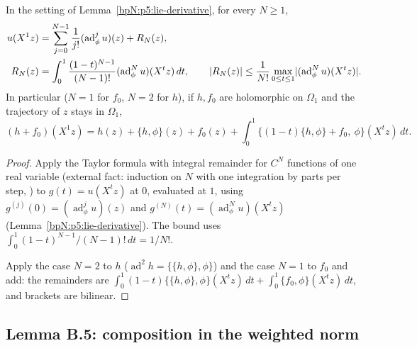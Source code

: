 \begin{lemma}\label{bpN:p5:taylor}
In the setting of Lemma~\ref{bpN:p5:lie-derivative}, for every $N\ge1$,
\begin{align*}
u(X^1z)&=\sum_{j=0}^{N-1}\frac1{j!}(\operatorname{ad}^j_\phi u)(z)+R_N(z),\\
R_N(z)&=\int_0^1\frac{(1-t)^{N-1}}{(N-1)!}(\operatorname{ad}^N_\phi u)(X^tz)\,dt,\qquad\lvert R_N(z)\rvert\le\frac1{N!}\max_{0\le t\le1}\lvert (\operatorname{ad}^N_\phi u)(X^tz)\rvert.
\end{align*}
In particular ($N=1$ for $f_0$, $N=2$ for $h$), if $h,f_0$ are holomorphic on $\Omega_1$ and the trajectory of $z$ stays in $\Omega_1$,
\begin{equation}\label{bpN:p5:eq:poschel}
(h+f_0)(X^1z)=h(z)+\{h,\phi\}(z)+f_0(z)+\int_0^1\bigl\{(1-t)\{h,\phi\}+f_0,\ \phi\bigr\}(X^tz)\,dt .
\end{equation}
\end{lemma}
\begin{proof}
\label{stepN:p5:ta-taylor} Apply the Taylor formula with integral remainder for $C^N$ functions of one real variable (external fact: induction on $N$ with one integration by parts per step, ) to $g(t)=u(X^tz)$ at $0$, evaluated at $1$, using $g^{(j)}(0)=(\operatorname{ad}^j_\phi u)(z)$ and $g^{(N)}(t)=(\operatorname{ad}^N_\phi u)(X^tz)$ (Lemma~\ref{bpN:p5:lie-derivative}). The bound uses $\int_0^1(1-t)^{N-1}/(N-1)!\,dt=1/N!$.

\label{stepN:p5:ta-poschel} Apply the case $N=2$ to $h$ ($\operatorname{ad}^2h=\{\{h,\phi\},\phi\}$) and the case $N=1$ to $f_0$ and add: the remainders are $\int_0^1(1-t)\{\{h,\phi\},\phi\}(X^tz)\,dt+\int_0^1\{f_0,\phi\}(X^tz)\,dt$, and brackets are bilinear.
\end{proof}

\subsection{Lemma B.5: composition in the weighted norm}\label{bpN:p5:s-b5}

